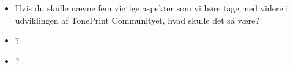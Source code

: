 \begin{itemize}
  \item Hvis du skulle nævne fem vigtige aspekter som vi børe tage med videre i udviklingen af TonePrint Communityet, hvad skulle det så være?
  \item ?
  \item ?
\end{itemize}
%
%
%
%

